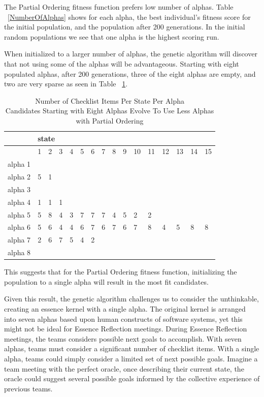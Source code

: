\documentclass[preprint,12pt,3p]{elsarticle}
\begin{document}
The Partial Ordering fitness function prefers low number of alphas. Table ~\ref{NumberOfAlphas} shows for each alpha, the best individual's fitness score for the initial population, and the population after 200 generations. In the initial random populations we see that one alpha is the highest scoring run.

When initialized to a larger number of alphas, the genetic algorithm will discover that not using some of the alphas will be advantageous. Starting with eight populated alphas, after 200 generations, three of the eight alphas are empty, and two are very sparse as seen in Table ~\ref{PartialOrderingPrefersLessAlphas}.

\begin{table}
\caption{Number of Checklist Items Per State Per Alpha \\ Candidates Starting with Eight Alphas Evolve To Use Less Alphas with Partial Ordering}
\label{PartialOrderingPrefersLessAlphas}
\centering
\begin{tabular}{|l|l|l|l|l|l|l|l|l|l|l|l|l|l|l|l|}
\hline
 & \multicolumn{15}{l|}{state} \\ \hline
 & 1  & 2  & 3  & 4  & 5  & 6  & 7  & 8  & 9  & 10  & 11  & 12  & 13  & 14  & 15 \\ \hline
alpha 1 &   &   &   &   &   &   &   &   &   &   &   &   &   &   &   \\ \hline
alpha 2 & 5 & 1 &   &   &   &   &   &   &   &   &   &   &   &   &   \\ \hline
alpha 3 &   &   &   &   &   &   &   &   &   &   &   &   &   &   &   \\ \hline
alpha 4 & 1 & 1 & 1 &   &   &   &   &   &   &   &   &   &   &   &   \\ \hline
alpha 5 & 5 & 8 & 4 & 3 & 7 & 7 & 7 & 4 & 5 & 2 & 2 &   &   &   &   \\ \hline
alpha 6 & 5 & 6 & 4 & 4 & 6 & 7 & 6 & 7 & 6 & 7 & 8 & 4 & 5 & 8 & 8 \\ \hline
alpha 7 & 2 & 6 & 7 & 5 & 4 & 2 &   &   &   &   &   &   &   &   &   \\ \hline
alpha 8 &   &   &   &   &   &   &   &   &   &   &   &   &   &   &   \\ \hline
\end{tabular}
\end{table}

This suggests that for the Partial Ordering fitness function, initializing the population to a single alpha will result in the most fit candidates. 

Given this result, the genetic algorithm challenges us to consider the unthinkable, creating an essence kernel with a single alpha. The original kernel is arranged into seven alphas based upon human constructs of software systems, yet this might not be ideal for Essence Reflection meetings. During Essence Reflection meetings, the teams considers possible next goals to accomplish. With seven alphas, teams must consider a significant number of checklist items. With a single alpha, teams could simply consider a limited set of next possible goals. Imagine a team meeting with the perfect oracle, once describing their current state, the oracle could suggest several possible goals informed by the collective experience of previous teams.   
\end{document}
